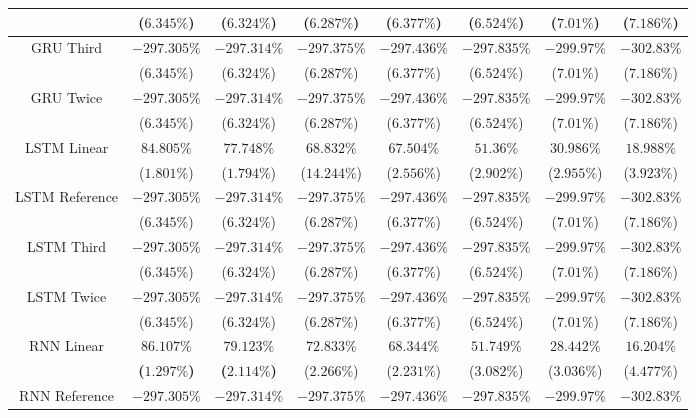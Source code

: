 \begin{table}[!ht]
{\begin{tabular}{|c|c|c|c|c|c|c|c|}
			 & ($6.345\%$) & ($6.324\%$) & ($6.287\%$) & ($6.377\%$) & ($6.524\%$) & ($7.01\%$) & ($7.186\%$) \\ \hline
			\multirow{2}{*}{GRU Third} & $-297.305\%$ & $-297.314\%$ & $-297.375\%$ & $-297.436\%$ & $-297.835\%$ & $-299.97\%$ & $-302.83\%$ \\
			 & ($6.345\%$) & ($6.324\%$) & ($6.287\%$) & ($6.377\%$) & ($6.524\%$) & ($7.01\%$) & ($7.186\%$) \\ \hline
			\multirow{2}{*}{GRU Twice} & $-297.305\%$ & $-297.314\%$ & $-297.375\%$ & $-297.436\%$ & $-297.835\%$ & $-299.97\%$ & $-302.83\%$ \\
			 & ($6.345\%$) & ($6.324\%$) & ($6.287\%$) & ($6.377\%$) & ($6.524\%$) & ($7.01\%$) & ($7.186\%$) \\ \hline
			\multirow{2}{*}{LSTM Linear} & $84.805\%$ & $77.748\%$ & $68.832\%$ & $67.504\%$ & $51.36\%$ & $30.986\%$ & $18.988\%$ \\
			 & ($1.801\%$) & ($1.794\%$) & ($14.244\%$) & ($2.556\%$) & ($2.902\%$) & ($2.955\%$) & ($3.923\%$) \\ \hline
			\multirow{2}{*}{LSTM Reference} & $-297.305\%$ & $-297.314\%$ & $-297.375\%$ & $-297.436\%$ & $-297.835\%$ & $-299.97\%$ & $-302.83\%$ \\
			 & ($6.345\%$) & ($6.324\%$) & ($6.287\%$) & ($6.377\%$) & ($6.524\%$) & ($7.01\%$) & ($7.186\%$) \\ \hline
			\multirow{2}{*}{LSTM Third} & $-297.305\%$ & $-297.314\%$ & $-297.375\%$ & $-297.436\%$ & $-297.835\%$ & $-299.97\%$ & $-302.83\%$ \\
			 & ($6.345\%$) & ($6.324\%$) & ($6.287\%$) & ($6.377\%$) & ($6.524\%$) & ($7.01\%$) & ($7.186\%$) \\ \hline
			\multirow{2}{*}{LSTM Twice} & $-297.305\%$ & $-297.314\%$ & $-297.375\%$ & $-297.436\%$ & $-297.835\%$ & $-299.97\%$ & $-302.83\%$ \\
			 & ($6.345\%$) & ($6.324\%$) & ($6.287\%$) & ($6.377\%$) & ($6.524\%$) & ($7.01\%$) & ($7.186\%$) \\ \hline
			\multirow{2}{*}{RNN Linear} & $\mathbf{86.107\%}$ & $\mathbf{79.123\%}$ & $72.833\%$ & $68.344\%$ & $51.749\%$ & $28.442\%$ & $16.204\%$ \\
			 & \textbf{(}$\mathbf{1.297\%}$\textbf{)} & \textbf{(}$\mathbf{2.114\%}$\textbf{)} & ($2.266\%$) & ($2.231\%$) & ($3.082\%$) & ($3.036\%$) & ($4.477\%$) \\ \hline
			\multirow{2}{*}{RNN Reference} & $-297.305\%$ & $-297.314\%$ & $-297.375\%$ & $-297.436\%$ & $-297.835\%$ & $-299.97\%$ & $-302.83\%$ \\

\end{tabular}}
\end{table}
